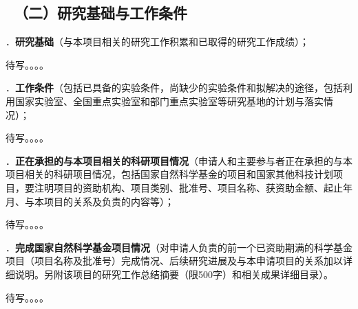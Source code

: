 {\color{MsBlue} \subsection{\texorpdfstring{\sihao \kaishu \quad \ （二）研究基础与工作条件 }{（二）研究基础与工作条件 }}}


{\sihao \color{MsBlue} ．{\bfseries 研究基础}（与本项目相关的研究工作积累和已取得的研究工作成绩）；}

待写。。。。

\vskip 5mm



{\sihao \color{MsBlue} ．{\bfseries 工作条件}（包括已具备的实验条件，尚缺少的实验条件和拟解决的途径，包括利用国家实验室、全国重点实验室和部门重点实验室等研究基地的计划与落实情况）；}

待写。。。。

\vskip 5mm



{\sihao \color{MsBlue} ．{\bfseries 正在承担的与本项目相关的科研项目情况}（申请人和主要参与者正在承担的与本项目相关的科研项目情况，包括国家自然科学基金的项目和国家其他科技计划项目，要注明项目的资助机构、项目类别、批准号、项目名称、获资助金额、起止年月、与本项目的关系及负责的内容等）；}

待写。。。。

\vskip 5mm



{\sihao \color{MsBlue} ．{\bfseries 完成国家自然科学基金项目情况}（对申请人负责的前一个已资助期满的科学基金项目（项目名称及批准号）完成情况、后续研究进展及与本申请项目的关系加以详细说明。另附该项目的研究工作总结摘要（限500字）和相关成果详细目录）。}

待写。。。。

\vskip 5mm
